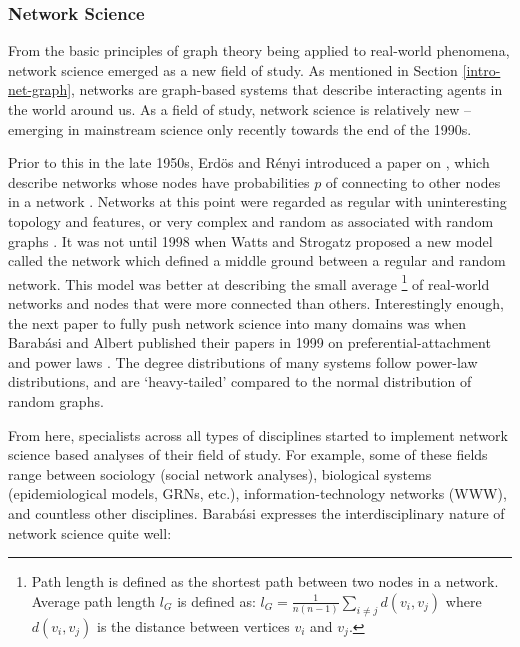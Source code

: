 \subsubsection{Network Science}
From the basic principles of graph theory being applied to real-world phenomena, network science emerged as a new field of study. As mentioned in Section \ref{intro-net-graph}, networks are graph-based systems that describe interacting agents in the world around us. As a field of study, network science is relatively new -- emerging in mainstream science only recently towards the end of the 1990s. 

Prior to this in the late 1950s,  Erd\"{o}s and  R\'{e}nyi introduced a paper on , which describe networks whose nodes have probabilities $p$ of connecting to other nodes in a network \citep{Erdoes1959}. Networks at this point were regarded as regular with uninteresting topology and features, or very complex and random as associated with random graphs \citep{Vespignani2018}. It was not until 1998 when Watts and Strogatz proposed a new model called the  network \citep{Watts1998} which defined a middle ground between a regular and random network. This model was better at describing the small average \footnote{ Path length is defined as the shortest path between two nodes in a network. Average path length $l_G$ is defined as: $l_G=\frac{1}{n (n-1)}\sum_{i\neq j} d(v_i,v_j)$ where $d(v_i,v_j)$ is the distance between vertices $v_i$ and $v_j$.} 
of real-world networks and nodes that were more connected than others. Interestingly enough, the next paper to fully push network science into many domains was when Barab\'{a}si and Albert published their papers in 1999 on preferential-attachment and power laws \citep{Barabasi1999_emergence,Barabasi1999_mean_field,Albert1999}. The degree distributions of many systems follow power-law distributions, and are `heavy-tailed' compared to the normal distribution of random graphs. 

From here, specialists across all types of disciplines started to implement network science based analyses of their field of study. For example, some of these fields range between sociology (social network analyses), biological systems (epidemiological models, \acrfull{GRNs}, etc.), information-technology networks (\acrfull{WWW}), and countless other disciplines. Barab\'{a}si expresses the interdisciplinary nature of network science quite well:

